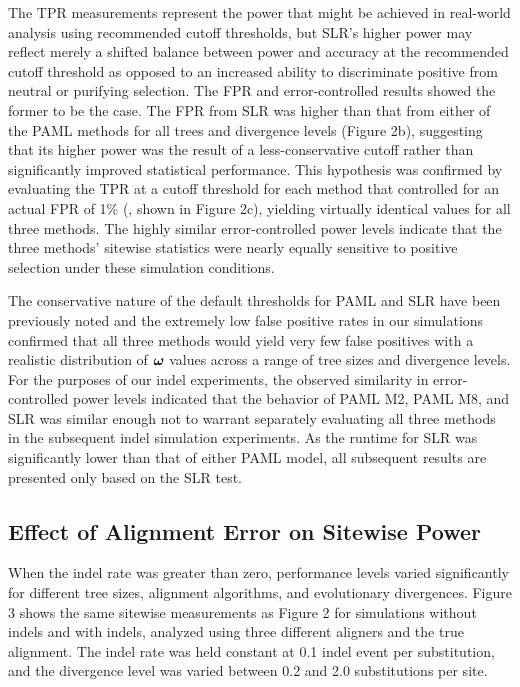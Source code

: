\documentclass{mbe}
\begin{document}
The TPR measurements represent the power that might be achieved in
real-world analysis using recommended cutoff thresholds, but SLR’s
higher power may reflect merely a shifted balance between power and
accuracy at the recommended cutoff threshold as opposed to an
increased ability to discriminate positive from neutral or purifying
selection. The FPR and error-controlled \tpr{} results showed the
former to be the case. The FPR from SLR was higher than that from
either of the PAML methods for all trees and divergence levels (Figure
2b), suggesting that its higher power was the result of a
less-conservative cutoff rather than significantly improved
statistical performance. This hypothesis was confirmed by evaluating
the TPR at a cutoff threshold for each method that controlled for an
actual FPR of 1\% (\tpr{}, shown in Figure 2c), yielding virtually
identical \tpr{} values for all three methods. The highly similar
error-controlled power levels indicate that the three methods’
sitewise statistics were nearly equally sensitive to positive
selection under these simulation conditions.

The conservative nature of the default thresholds for PAML and SLR
have been previously noted
\citep{Anisimova2002Accuracy,Yang2005Bayes,Massingham2005Detecting}
and the extremely low false positive rates in our simulations
confirmed that all three methods would yield very few false positives
with a realistic distribution of $\bm{\omega}{}$ values across a range of
tree sizes and divergence levels. For the purposes of our indel
experiments, the observed similarity in error-controlled power levels
indicated that the behavior of PAML M2, PAML M8, and SLR was similar
enough not to warrant separately evaluating all three methods in the
subsequent indel simulation experiments. As the runtime for SLR was
significantly lower than that of either PAML model, all subsequent
results are presented only based on the SLR test.

\subsection*{Effect of Alignment Error on Sitewise Power}

When the indel rate was greater than zero, performance levels varied
significantly for different tree sizes, alignment algorithms, and
evolutionary divergences. Figure 3 shows the same sitewise
measurements as Figure 2 for simulations without indels and with
indels, analyzed using three different aligners and the true
alignment. The indel rate was held constant at 0.1 indel event per
substitution, and the divergence level was varied between 0.2 and 2.0
substitutions per site.
\end{document}

